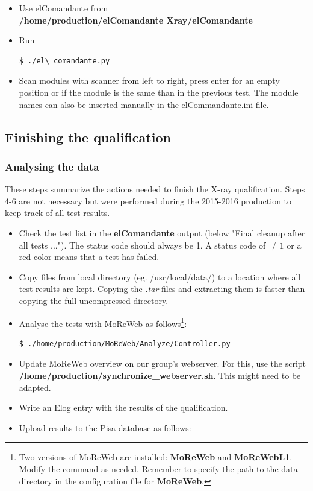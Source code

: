 \documentclass[a4paper,12pt,twoside]{article}
\begin{document}
\begin{itemize}
\item Use elComandante from \\

\textbf{/home/production/elComandante{\color{Red} Xray}/elComandante}
\newpage
\item Run \begin{verbatim}
$ ./el\_comandante.py
\end{verbatim}
\item Scan modules with scanner from left to right, press enter for an empty position or if the module is the same than in the previous test. The module names can also be inserted manually in the elCommandante.ini file.
\end{itemize}


\subsection{Finishing the qualification}

\subsubsection{Analysing the data}

These steps summarize the actions needed to finish the X-ray qualification. Steps 4-6 are not necessary but were performed during the 2015-2016 production to keep track of all test results.

\begin{itemize}
\item Check the test list in the \textbf{elComandante} output (below "Final cleanup after all tests ..."). The status code should always be 1. A status code of $\neq 1$ or a red color means that a test has failed. 
\item Copy files from local directory (eg. /usr/local/data/) to a location where all test results are kept. Copying the \textit{.tar} files and extracting them is faster than copying the full uncompressed directory. 
\item Analyse the tests with MoReWeb as follows\footnote{Two versions of MoReWeb are installed: \textbf{MoReWeb} and  \textbf{MoReWebL1}. Modify the command as needed. Remember to specify the path to the data directory in the configuration file for \textbf{MoReWeb}.}:
\begin{verbatim}
$ ./home/production/MoReWeb/Analyze/Controller.py
\end{verbatim}
\item Update MoReWeb overview on our group's webserver. For this, use the script \textbf{/home/production/synchronize\_webserver.sh}. This might need to be adapted.
\item Write an Elog entry with the results of the qualification.
\item Upload results to the Pisa database as follows:
\end{itemize}
\end{document}
